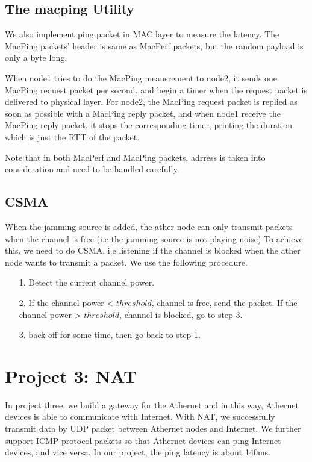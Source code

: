 \documentclass[11pt, conference]{IEEEtran}
\begin{document}
\subsection{The \textsf{macping} Utility}

We also implement ping packet in MAC layer to measure the latency. The MacPing packets' header is same as MacPerf packets, but the random payload is only a byte long.

When node1 tries to do the MacPing meausrement to node2, it sends one MacPing request packet per second, and begin a timer when the request packet is delivered to physical layer. For node2, the MacPing request packet is replied
as soon as possible with a MacPing reply packet, and when node1 receive the MacPing reply packet, it stops the corresponding timer, printing the duration which is just the RTT of the packet.

Note that in both MacPerf and MacPing packets, adrress is taken into consideration and need to be handled carefully.

\subsection{{CSMA}}
When the jamming source is added, the ather node can only transmit packets when the channel is free (i.e the jamming source is not playing noise)
To achieve this, we need to do CSMA, i.e listening if the channel is blocked when the ather node wants to transmit a packet. We use the following procedure.
\begin{itemize}
    \item[1.] Detect the current channel power.
    \item[2.] If the channel power < $threshold$, channel is free, send the packet. If the channel power > $threshold$, channel is blocked, go to step 3. 
    \item[3.] back off for some time, then go back to step 1.
\end{itemize}

\section{Project 3: NAT}

In project three, we build a gateway for the Athernet and in this way, Athernet devices is able to communicate with Internet. With NAT, we successfully transmit data by UDP packet between Athernet nodes and Internet. 
We further support ICMP protocol packets so that Athernet devices can ping Internet devices, and vice versa. In our project, the ping latency is about 140ms.
\end{document}
